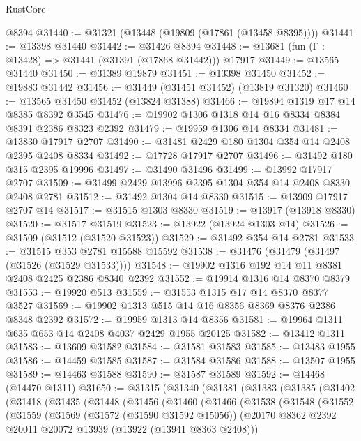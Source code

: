 \begin{lexlean}{RustCore}
\begin{coremodule}
    @8394
@31440 := @31321 (@13448 (@19809 (@17861 (@13458 @8395))))
@31441 := @13398 @31440
@31442 := @31426 @8394
@31448 := @13681 (fun (Γ : @13428) => @31441 (@31391 (@17868 @31442))) @17917
@31449 := @13565 @31440
@31450 := @31389 @19879
@31451 := @13398 @31450
@31452 := @19883 @31442
@31456 := @31449 (@31451 @31452) (@13819 @31320)
@31460 := @13565 @31450 @31452 (@13824 @31388)
@31466 := @19894 @1319 @17 @14 @8385 @8392 @3545
@31476 := @19902 @1306 @1318 @14 @16 @8334 @8384 @8391 @2386 @8323 @2392
@31479 := @19959 @1306 @14 @8334
@31481 := @13830 @17917 @2707
@31490 := @31481 @2429 @180 @1304 @354 @14 @2408 @2395 @2408 @8334
@31492 := @17728 @17917 @2707
@31496 := @31492 @180 @315 @2395 @19996
@31497 := @31490 @31496
@31499 := @13992 @17917 @2707
@31509 := @31499 @2429 @13996 @2395 @1304 @354 @14 @2408 @8330 @2408 @2781
@31512 := @31492 @1304 @14 @8330
@31515 := @13909 @17917 @2707 @14
@31517 := @31515 @1303 @8330
@31519 := @13917 (@13918 @8330)
@31520 := @31517 @31519
@31523 := @13922 (@13924 @1303 @14)
@31526 := @31509 (@31512 (@31520 @31523))
@31529 := @31492 @354 @14 @2781
@31533 := @31515 @353 @2781 @15588 @15592
@31538 := @31476 (@31479 (@31497 (@31526 (@31529 @31533))))
@31548 := @19902 @1316 @192 @14 @11 @8381 @2408 @2425 @2386 @8340 @2392
@31552 := @19914 @1316 @14 @8370 @8379
@31553 := @19920 @513
@31559 := @31553 @1315 @17 @14 @8370 @8377 @3527
@31569 := @19902 @1313 @515 @14 @16 @8356 @8369 @8376 @2386 @8348 @2392
@31572 := @19959 @1313 @14 @8356
@31581 := @19964 @1311 @635 @653 @14 @2408 @4037 @2429 @1955 @20125
@31582 := @13412 @1311
@31583 := @13609 @31582
@31584 := @31581 @31583
@31585 := @13483 @1955
@31586 := @14459 @31585
@31587 := @31584 @31586
@31588 := @13507 @1955
@31589 := @14463 @31588
@31590 := @31587 @31589
@31592 := @14468 (@14470 @1311)
@31650 := @31315
    (@31340
      (@31381
        (@31383
          (@31385
            (@31402
              (@31418
                (@31435
                  (@31448
                    (@31456
                      (@31460
                        (@31466
                          (@31538
                            (@31548
                              (@31552
                                (@31559
                                  (@31569
                                    (@31572 (@31590 @31592 @15056))
                                    (@20170
                                      @8362
                                      @2392
                                      @20011
                                      @20072
                                      @13939
                                      (@13922 (@13941 @8363 @2408)))

\end{coremodule}
\end{lexlean}
